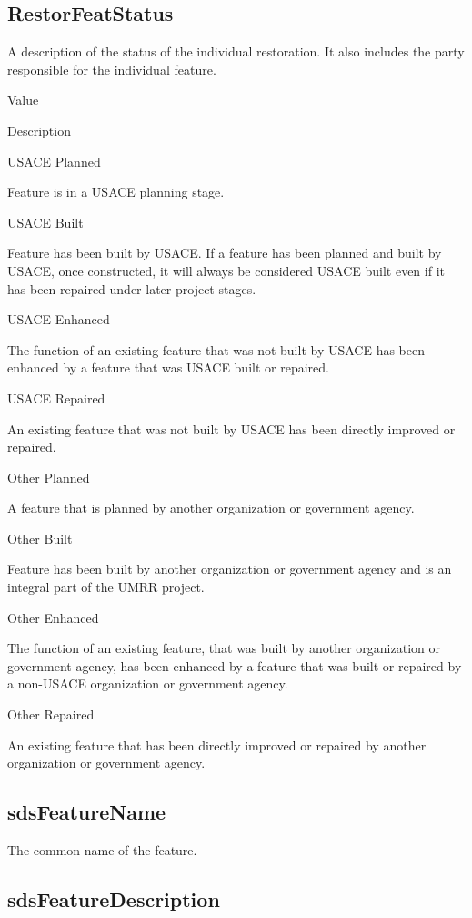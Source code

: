 \documentclass[
  letterpaper,
  DIV=11,
  numbers=noendperiod]{scrreprt}
\begin{document}
\subsection{RestorFeatStatus}\label{restorfeatstatus-18}

A description of the status of the individual restoration. It also
includes the party responsible for the individual feature.

Value

Description

USACE Planned

Feature is in a USACE planning stage.

USACE Built

Feature has been built by USACE. If a feature has been planned and built
by USACE, once constructed, it will always be considered USACE built
even if it has been repaired under later project stages.

USACE Enhanced

The function of an existing feature that was not built by USACE has been
enhanced by a feature that was USACE built or repaired.

USACE Repaired

An existing feature that was not built by USACE has been directly
improved or repaired.

Other Planned

A feature that is planned by another organization or government agency.

Other Built

Feature has been built by another organization or government agency and
is an integral part of the UMRR project.

Other Enhanced

The function of an existing feature, that was built by another
organization or government agency, has been enhanced by a feature that
was built or repaired by a non-USACE organization or government agency.

Other Repaired

An existing feature that has been directly improved or repaired by
another organization or government agency.

\subsection{sdsFeatureName}\label{sdsfeaturename-18}

The common name of the feature.

\subsection{sdsFeatureDescription}\label{sdsfeaturedescription-18}
\end{document}
